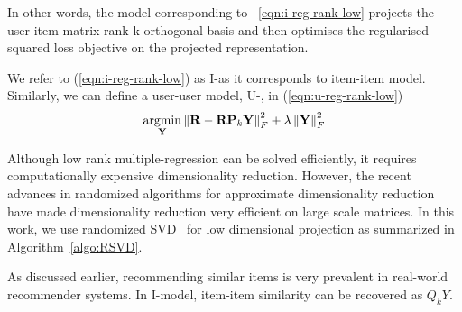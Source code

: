 In other words, the model corresponding to ~\ref{eqn:i-reg-rank-low} projects the user-item matrix rank-k orthogonal basis and then optimises the regularised squared loss objective on the projected representation.

We refer to (\ref{eqn:i-reg-rank-low}) as I-\LinearLow as it corresponds to item-item model. Similarly, we can define a user-user model, U-\LinearLow, in (\ref{eqn:u-reg-rank-low})
\begin{align}
\label{eqn:u-reg-rank-low}
\underset{\mathbf{Y}}{\mathrm{argmin}}  \left \| \mathbf{R} - \mathbf{R}\mathbf{P}_k\mathbf{Y}\right \|_F^2 + \lambda \left \|  \mathbf{Y} \right \|_F^2 
\end{align}

Although low rank multiple-regression can be solved efficiently, it requires computationally expensive dimensionality reduction. However, the recent advances in randomized algorithms for approximate dimensionality reduction~\citep{halko2011} have made dimensionality reduction very efficient on large scale matrices. In this work, we use randomized SVD~\citep{halko2011} for low dimensional projection as summarized in Algorithm~\ref{algo:RSVD}.

As discussed earlier, recommending similar items is very prevalent in real-world recommender systems.
In I-\LinearLow model, item-item similarity can be recovered as $Q_kY$. 

\begin{equation*}
\end{equation*}


